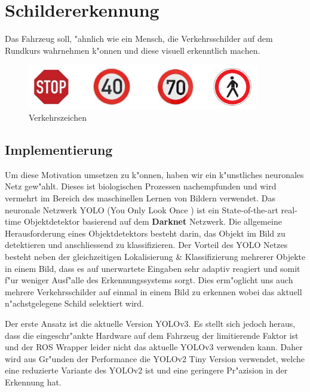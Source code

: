 \section{Schildererkennung}
\label{sec:schildererkennung}

Das Fahrzeug soll, "ahnlich wie ein Mensch, die Verkehrsschilder auf dem Rundkurs wahrnehmen k"onnen und diese visuell erkenntlich machen.

\begin{figure}[h]
	\centering
	\includegraphics[width=0.9\textwidth]{images/Verkehrszeichen}
	\caption{Verkehrszeichen}
	\label{fig:verkehrszeichen}
\end{figure}

\subsection{Implementierung}
Um diese Motivation umsetzen zu k"onnen, haben wir ein k"unstliches neuronales Netz gew"ahlt. Dieses ist biologischen Prozessen nachempfunden und wird vermehrt im Bereich des maschinellen Lernen von Bildern verwendet. Das neuronale Netzwerk YOLO (You Only Look Once \cite{darknet13}) ist ein State-of-the-art real-time Objektdetektor basierend auf dem \textbf{Darknet} Netzwerk. Die allgemeine Herausforderung eines Objektdetektors besteht darin, das Objekt im Bild zu detektieren und anschliessend zu klassifizieren. Der Vorteil des YOLO Netzes besteht neben der gleichzeitigen Lokalisierung \& Klassifizierung mehrerer Objekte in einem Bild, dass es auf unerwartete Eingaben sehr adaptiv reagiert und somit f"ur weniger Ausf"alle des Erkennungssystems sorgt. Dies erm"oglicht uns auch mehrere Verkehrsschilder auf einmal in einem Bild zu erkennen wobei das aktuell n"achstgelegene Schild selektiert wird.

Der erste Ansatz ist die aktuelle Version YOLOv3. Es stellt sich jedoch heraus, dass die eingeschr"ankte Hardware auf dem Fahrzeug der limitierende Faktor ist und der ROS Wrapper leider nicht das aktuelle YOLOv3 verwenden kann. Daher wird aus Gr"unden der Performance die YOLOv2 Tiny Version verwendet, welche eine reduzierte Variante des YOLOv2 ist und eine geringere Pr"azision in der Erkennung hat.

